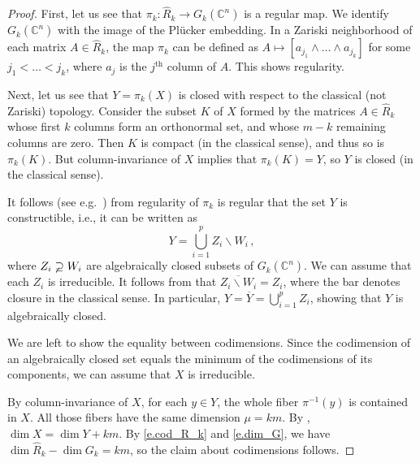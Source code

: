 \documentclass[10pt, a4paper]{amsart}
\theoremstyle{plain}
\theoremstyle{definition}
\theoremstyle{remark}
\theoremstyle{note}
\numberwithin{equation}{section}
\begin{document}
\begin{proof}
First, let us see that $\pi_k \colon \hat{R}_k \to G_k({\mathbb{C}}^n)$ is a regular map.
We identify $G_k({\mathbb{C}}^n)$ with the image of the Pl\"ucker embedding.
In a Zariski neighborhood of each  matrix $A \in \hat{R}_k$, 
the map $\pi_k$ can be defined as $A \mapsto [a_{j_1} \wedge \dots \wedge a_{j_k}]$
for some $j_1 < \dots < j_k$, where $a_j$ is the $j^\text{th}$ column of $A$.
This shows regularity.
	
Next, let us see that $Y = \pi_k (X)$ is closed with respect to the classical (not Zariski)
topology.
Consider the subset $K$ of $X$ formed by the matrices $A \in \hat{R}_k$ 
whose first $k$ columns form an orthonormal set, and whose $m-k$ remaining columns are zero.
Then $K$ is compact (in the classical sense), and thus so is $\pi_k(K)$.
But column-invariance of $X$ implies that $\pi_k(K) = Y$, so $Y$ is closed (in the classical sense).

It follows (see e.g.~\cite[p.39]{Harris}) 
from regularity of $\pi_k$ is regular that the set $Y$ is constructible, i.e., 
it can be written as
$$
Y = \bigcup_{i=1}^{p} Z_i {\smallsetminus} W_i \, ,
$$
where $Z_i \varsupsetneq W_i$ are algebraically closed subsets of $G_k({\mathbb{C}}^n)$.
We can assume that each $Z_i$ is irreducible.
It follows from \cite[Thrm.~2.33]{Mumford} that $\overline{Z_i {\smallsetminus} W_i} = Z_i$,
where the bar denotes closure in the classical sense.
In particular, $Y = \overline{Y} = \bigcup_{i=1}^{p} Z_i$,
showing that $Y$ is algebraically closed.

We are left to show the equality between codimensions.
Since the codimension of an algebraically closed set equals the minimum of the codimensions of its components, we can assume that $X$ is irreducible.

By column-invariance of $X$,
for each $y\in Y$, the whole fiber $\pi^{-1}(y)$ is contained in $X$.
All those fibers have the same dimension $\mu = km$.
By \cite[Thrm.~11.12]{Harris}, $\dim X = \dim Y + km$.
By \eqref{e.cod_R_k} and \eqref{e.dim_G}, we have $\dim \hat{R}_k - \dim G_k = km$,
so the claim about codimensions follows.
\end{proof}
\end{document}
